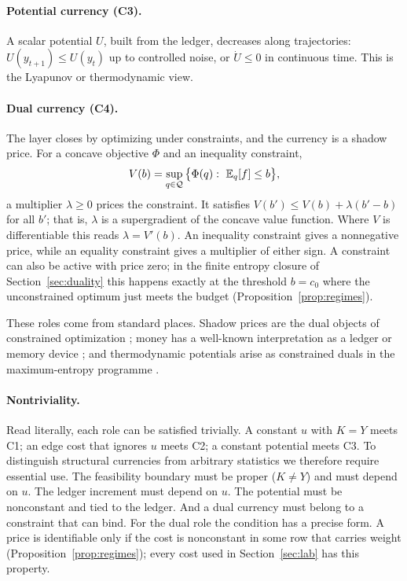 \paragraph{Potential currency (C3).} A scalar potential \(U\), built from the ledger, decreases along trajectories: \(U(y_{t+1})\le U(y_t)\) up to controlled noise, or \(\dot U\le 0\) in continuous time. This is the Lyapunov or thermodynamic view.

\paragraph{Dual currency (C4).} The layer closes by optimizing under constraints, and the currency is a shadow price. For a concave objective \(\Phi\) and an inequality constraint,
\[
V(b)=\sup_{q\in\mathcal Q}\big\{\Phi(q):\ \E_q[f]\le b\big\},
\]
a multiplier \(\lambda\ge0\) prices the constraint. It satisfies \(V(b')\le V(b)+\lambda(b'-b)\) for all \(b'\); that is, \(\lambda\) is a supergradient of the concave value function. Where \(V\) is differentiable this reads \(\lambda=V'(b)\). An inequality constraint gives a nonnegative price, while an equality constraint gives a multiplier of either sign. A constraint can also be active with price zero; in the finite entropy closure of Section~\ref{sec:duality} this happens exactly at the threshold \(b=c_0\) where the unconstrained optimum just meets the budget (Proposition~\ref{prop:regimes}).

These roles come from standard places. Shadow prices are the dual objects of constrained optimization \cite{boyd2004convex}; money has a well-known interpretation as a ledger or memory device \cite{kocherlakota1998money}; and thermodynamic potentials arise as constrained duals in the maximum-entropy programme \cite{jaynes1957information}.

\paragraph{Nontriviality.} Read literally, each role can be satisfied trivially. A constant \(u\) with \(K=Y\) meets C1; an edge cost that ignores \(u\) meets C2; a constant potential meets C3. To distinguish structural currencies from arbitrary statistics we therefore require essential use. The feasibility boundary must be proper (\(K\ne Y\)) and must depend on \(u\). The ledger increment must depend on \(u\). The potential must be nonconstant and tied to the ledger. And a dual currency must belong to a constraint that can bind. For the dual role the condition has a precise form. A price is identifiable only if the cost is nonconstant in some row that carries weight (Proposition~\ref{prop:regimes}); every cost used in Section~\ref{sec:lab} has this property.

